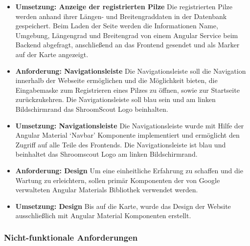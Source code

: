 \documentclass[../main.tex]{subfiles}
\begin{document}
\begin{itemize}
	\item \textbf{Umsetzung: Anzeige der registrierten Pilze}
	      Die registrierten Pilze werden anhand ihrer Längen- und Breitengraddaten in der Datenbank gespeichert. Beim Laden der Seite werden die Informationen
	      Name, Umgebung, Längengrad und Breitengrad von einem Angular Service beim Backend abgefragt, anschließend an das Frontend gesendet und als Marker auf
	      der Karte angezeigt.

	\item \textbf{Anforderung: Navigationsleiste}
	      Die Navigationsleiste soll die Navigation innerhalb der Webseite ermöglichen und die Möglichkeit bieten, die Eingabemaske zum Registrieren eines
	      Pilzes zu öffnen, sowie zur Startseite zurückzukehren. Die Navigationsleiste soll blau sein und am linken Bildschirmrand das ShroomScout Logo
	      beinhalten.

	\item \textbf{Umsetzung: Navigationsleiste}
	      Die Navigationsleiste wurde mit Hilfe der Angular Material `Navbar' Komponente implementiert und ermöglicht den Zugriff auf alle Teile des Frontends.
	      Die Navigationsleiste ist blau und beinhaltet das Shroomscout Logo am linken Bildschirmrand.

	\item \textbf{Anforderung: Design}
	      Um eine einheitliche Erfahrung zu schaffen und die Wartung zu erleichtern, sollen primär Komponenten der von Google verwalteten Angular Materials
	      Bibliothek verwendet werden.

	\item \textbf{Umsetzung: Design}
	      Bis auf die Karte, wurde das Design der Website ausschließlich mit Angular Material Komponenten erstellt.

\end{itemize}

\subsubsection{Nicht-funktionale Anforderungen}
\end{document}
